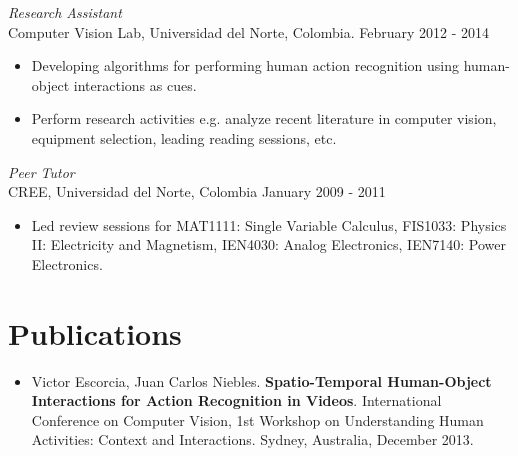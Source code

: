 \documentclass[margin]{res}
\begin{document}
\begin{resume}
 \textit{Research Assistant}\\
 Computer Vision Lab, Universidad del Norte, Colombia. \hfill February 2012 - 2014 \\
 \begin{itemize} \itemsep -2pt %
  \item Developing algorithms for performing human action recognition using
 human-object interactions as cues.
 \item Perform research activities e.g. analyze recent literature in computer
       vision, equipment selection, leading reading sessions, etc.
 \end{itemize}
 
 \textit{Peer Tutor}\\
 CREE, Universidad del Norte, Colombia \hfill January  2009 - 2011 \\
 \begin{itemize} \itemsep -2pt %
  \item Led review sessions for MAT1111: Single Variable Calculus, FIS1033:
 Physics II: Electricity and Magnetism, IEN4030: Analog Electronics,
 IEN7140: Power Electronics.
  \end{itemize}



\section{Publications} 
\begin{itemize} \itemsep -2pt %
\item Victor Escorcia, Juan Carlos Niebles. \textbf{Spatio-Temporal 
Human-Object Interactions for Action Recognition in Videos}. International
Conference on Computer Vision, 1st Workshop on Understanding Human Activities:
Context and Interactions. Sydney, Australia, December 2013.
\smallskip


\end{itemize}
\end{resume}
\end{document}
